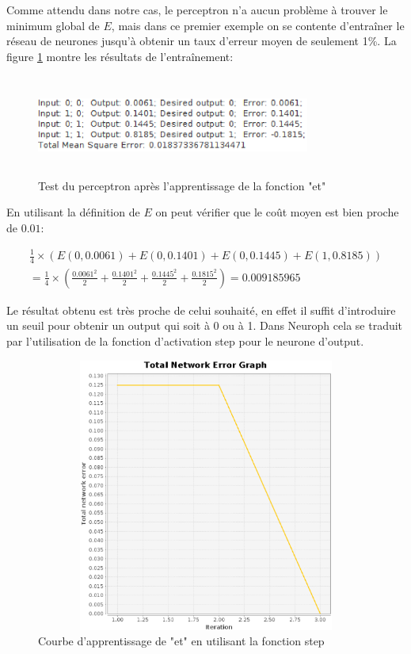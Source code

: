 \documentclass[twoside,openright,a4paper,11pt,french]{article}
\begin{document}
Comme attendu dans notre cas, le perceptron n'a aucun problème à trouver le
minimum global de $E$, mais dans ce premier exemple on se contente d'entraîner le
réseau de neurones jusqu'à obtenir un taux d'erreur moyen de seulement 1\%. La
figure \ref{fig:andtest1} montre les résultats de l'entraînement:

\begin{figure}[ht]
\centering
\includegraphics[width=9cm,height=3.3cm]{./pics/andtest1.eps}
\caption{Test du perceptron après l'apprentissage de la fonction "et"}
\label{fig:andtest1}
\end{figure}

En utilisant la définition de $E$ on peut vérifier que le coût
moyen est bien proche de $0.01$:

\vspace{1.1cm}

\begin{equation*}
  \begin{aligned}
  \tfrac{1}{4}\times(E(0,0.0061)+E(0,0.1401)+E(0,0.1445)+E(1,0.8185))\\
  = \tfrac{1}{4}\times(\tfrac{0.0061^2}{2}+\tfrac{0.1401^2}{2}+\tfrac{0.1445^2}{2}+\tfrac{0.1815^2}{2}) =
  0.009185965
  \end{aligned}
\end{equation*}

\vspace{1.3cm}

Le résultat obtenu est très proche de celui souhaité, en effet il suffit 
d'introduire un seuil pour obtenir un output qui soit à 0 ou à 1.
Dans Neuroph cela se traduit par l'utilisation de la fonction d'activation step pour le
neurone d'output.


\clearpage
\begin{figure}[ht]
\centering
\includegraphics[width=12cm,height=9cm]{./pics/and_error2.eps}
\caption{Courbe d'apprentissage de "et" en utilisant la fonction step}
\label{fig:anderr1}
\end{figure}
\end{document}
